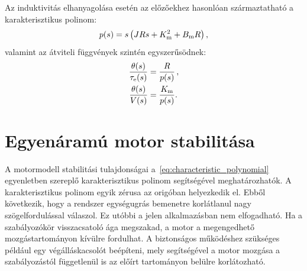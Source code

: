 Az induktivitás elhanyagolása esetén az előzőekhez hasonlóan származtatható a karakterisztikus polinom:
\begin{align}\label{eq:characteristic_polynomial}
    p(s) = s\left(JRs + K_{\mathrm{m}}^2 + B_{\mathrm{m}} R\right),
\end{align}
valamint az átviteli függvények szintén egyszerűsödnek:
\begin{equation}\label{eq:transfer_function}
    \begin{split}
        \frac{\theta(s)}{\tau_{\mathrm{e}}(s)} &= \frac{R}{p(s)}\,,\\
        \frac{\theta(s)}{V(s)} &= \frac{K_{\mathrm{m}}}{p(s)}.
    \end{split}
\end{equation}

\section{Egyenáramú motor stabilitása}
A motormodell stabilitási tulajdonságai a~\eqref{eq:characteristic_polynomial} egyenletben szereplő karakterisztikus 
polinom segítségével meghatározhatók.
A karakterisztikus polinom egyik zérusa az origóban helyezkedik el. Ebből következik, hogy a rendszer
egységugrás bemenetre korlátlanul nagy szögelfordulással válaszol. Ez utóbbi a jelen alkalmazásban nem elfogadható. 
Ha a szabályozókör visszacsatoló ága megszakad, a motor a megengedhető mozgástartományon kívülre fordulhat.
A biztonságos működéshez szükséges például egy végálláskacsolót beépíteni, mely segítségével a motor 
mozgása a szabályozástól függetlenül is az előírt tartományon belülre korlátozható.

